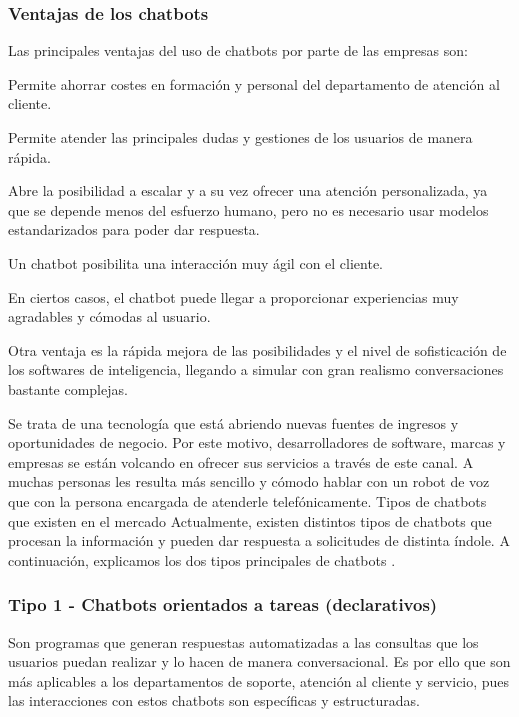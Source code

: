\subsubsection{Ventajas de los chatbots}

Las principales ventajas del uso de chatbots por parte de las empresas son:

Permite ahorrar costes en formación y personal del departamento de atención al cliente.

Permite atender las principales dudas y gestiones de los usuarios de manera rápida.

Abre la posibilidad a escalar y a su vez ofrecer una atención personalizada, ya que se depende menos del esfuerzo humano, pero no es necesario usar modelos estandarizados para poder dar respuesta.

Un chatbot posibilita una interacción muy ágil con el cliente.

En ciertos casos, el chatbot puede llegar a proporcionar experiencias muy agradables y cómodas al usuario.

Otra ventaja es la rápida mejora de las posibilidades y el nivel de sofisticación de los softwares de inteligencia, llegando a simular con gran realismo conversaciones bastante complejas.

Se trata de una tecnología que está abriendo nuevas fuentes de ingresos y oportunidades de negocio. Por este motivo, desarrolladores de software, marcas y empresas se están volcando en ofrecer sus servicios a través de este canal.
A muchas personas les resulta más sencillo y cómodo hablar con un robot de voz que con la persona encargada de atenderle telefónicamente.
Tipos de chatbots que existen en el mercado
Actualmente, existen distintos tipos de chatbots que procesan la información y pueden dar respuesta a solicitudes de distinta índole. A continuación, explicamos los dos tipos principales de chatbots \cite{Escote}.

\subsubsection{Tipo 1 - Chatbots orientados a tareas (declarativos)}

Son programas que generan respuestas automatizadas a las consultas que los usuarios puedan realizar y lo hacen de manera conversacional. Es por ello que son más aplicables a los departamentos de soporte, atención al cliente y servicio, pues las interacciones con estos chatbots son específicas y estructuradas.

